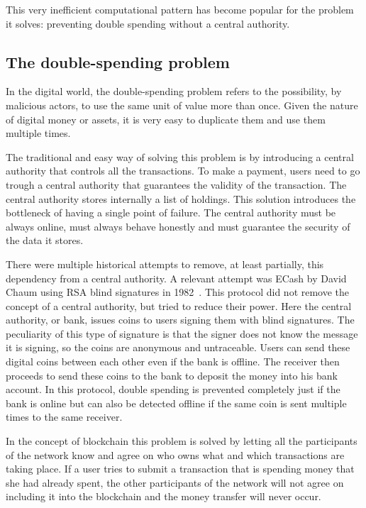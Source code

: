 This very inefficient computational pattern has become popular for the problem it solves: preventing double spending without a central authority. 

\subsection{The double-spending problem}

In the digital world, the double-spending problem refers to the possibility, by malicious actors, to use the same unit of value more than once. Given the nature of digital money or assets, it is very easy to duplicate them and use them multiple times.

The traditional and easy way of solving this problem is by introducing a central authority that controls all the transactions. To make a payment, users need to go trough a central authority that guarantees the validity of the transaction. The central authority stores internally a list of holdings. This solution introduces the bottleneck of having a single point of failure. The central authority must be always online, must always behave honestly and must guarantee the security of the data it stores. 

There were multiple historical attempts to remove, at least partially, this dependency from a central authority. A relevant attempt was ECash by David Chaum using RSA blind signatures in 1982~\cite{blind-signatures}. This protocol did not remove the concept of a central authority, but tried to reduce their power. Here the central authority, or bank, issues coins to users signing them with blind signatures. The peculiarity of this type of signature is that the signer does not know the message it is signing, so the coins are anonymous and untraceable. Users can send these digital coins between each other even if the bank is offline. The receiver then proceeds to send these coins to the bank to deposit the money into his bank account. In this protocol, double spending is prevented completely just if the bank is online but can also be detected offline if the same coin is sent multiple times to the same receiver.

In the concept of blockchain this problem is solved by letting all the participants of the network know and agree on who owns what and which transactions are taking place. If a user tries to submit a transaction that is spending money that she had already spent, the other participants of the network will not agree on including it into the blockchain and the money transfer will never occur.

